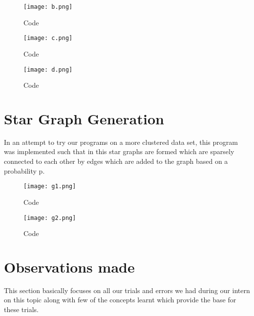 \documentclass[12pt,a4paper,onecolumn]{article}
\begin{document}
\begin{figure}[H]
 \texttt{[image: b.png]}
  \caption{Code}
  \label{Figure 5}
\end{figure}

\begin{figure}[H]
 \texttt{[image: c.png]}
  \caption{Code}
  \label{Figure 6}
\end{figure}

\begin{figure}[H]
 \texttt{[image: d.png]}
  \caption{Code}
  \label{Figure 7}
\end{figure}

\section{Star Graph Generation}
In an attempt to try our programs on a more clustered data set, this program was implemented such that in this star graphs are formed which are sparsely connected to each other by edges which are added to the graph based on a probability p.

\begin{figure}[H]
 \texttt{[image: g1.png]}
  \caption{Code}
  \label{Figure 8}
\end{figure}

\begin{figure}[H]
 \texttt{[image: g2.png]}
  \caption{Code}
  \label{Figure 9}
\end{figure}

\section{Observations made}
This section basically focuses on all our trials and errors we had during our intern on this topic along with few of the concepts learnt which provide the base for these trials.
\end{document}

